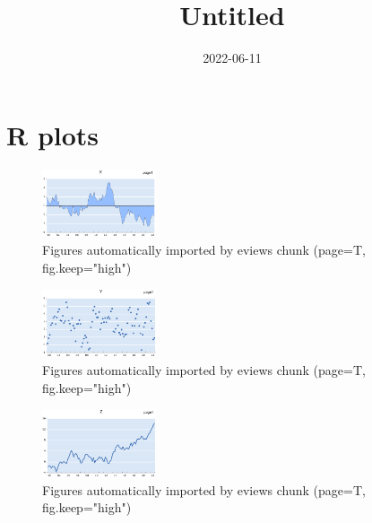 \documentclass[
]{article}
\title{Untitled}
\author{}
\date{\vspace{-2.5em}2022-06-11}
\begin{document}
\maketitle

{
\setcounter{tocdepth}{2}
\tableofcontents
}
\hypertarget{r-plots}{%
\section{R plots}\label{r-plots}}

\begin{figure}[h]

{\centering \includegraphics[width=0.3\textwidth,height=0.25\textwidth]{eviews_graphs_files/figure-latex//biscuit-page1-graph1} 

}

\caption{Figures automatically imported by eviews chunk (page=T, fig.keep="high")}\label{fig:biscuit-1}
\end{figure}
\begin{figure}[h]

{\centering \includegraphics[width=0.3\textwidth,height=0.25\textwidth]{eviews_graphs_files/figure-latex//biscuit-page1-graph2} 

}

\caption{Figures automatically imported by eviews chunk (page=T, fig.keep="high")}\label{fig:biscuit-2}
\end{figure}
\begin{figure}[h]

{\centering \includegraphics[width=0.3\textwidth,height=0.25\textwidth]{eviews_graphs_files/figure-latex//biscuit-page1-graph3} 

}

\caption{Figures automatically imported by eviews chunk (page=T, fig.keep="high")}\label{fig:biscuit-3}
\end{figure}
\end{document}
